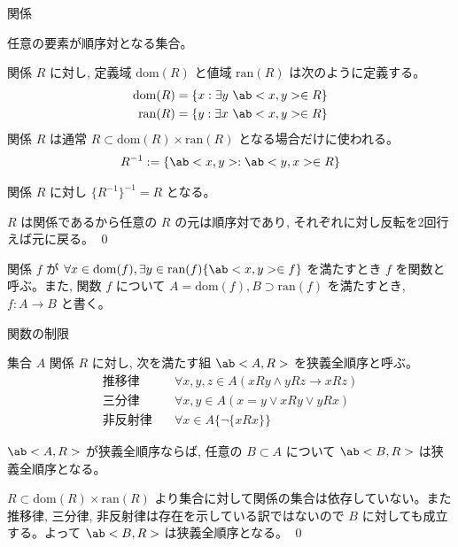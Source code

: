 \documentclass[uplatex,dvipdfmx,a4paper,11pt]{jlreq}
\makeatletter
\theoremstyle{definition}
\renewenvironment{proof}[1][\proofname]{\par
  \normalfont
  \topsep6\p@\@plus6\p@ \trivlist
  \item[\hskip\labelsep{\bfseries #1}\@addpunct{\bfseries}]\ignorespaces\quad\par
}{%
  \qed\endtrivlist\@endpefalse
}
\renewcommand\proofname{証明}
\makeatother
\begin{document}
\begin{definition}
  関係

  任意の要素が順序対となる集合。

  関係 $R$ に対し, 定義域 $\mathrm{dom}(R)$ と値域 $\mathrm{ran}(R)$ は次のように定義する。
  \begin{align}
    \mathrm{dom}(R) & = \{x:\exists y\ \ab<x,y>\in R\} \\
    \mathrm{ran}(R) & = \{y:\exists x\ \ab<x,y>\in R\}
  \end{align}
  関係 $R$ は通常 $R\subset \mathrm{dom}(R)\times\mathrm{ran}(R)$ となる場合だけに使われる。
  \begin{align}
    R^{-1} := \{\ab<x, y>:\ab<y, x>\in R\}
  \end{align}
\end{definition}

\begin{theorem}
  関係 $R$ に対し $\{R^{-1}\}^{-1} = R$ となる。
\end{theorem}
\begin{proof}
  $R$ は関係であるから任意の $R$ の元は順序対であり, それぞれに対し反転を2回行えば元に戻る。
\end{proof}


\begin{definition}[関数]
  関係 $f$ が $\forall x\in\mathrm{dom}(f),\exists y\in\mathrm{ran}(f)\{\ab<x,y>\in f\}$ を満たすとき $f$ を関数と呼ぶ。また, 関数 $f$ について $A=\mathrm{dom}(f), B\supset\mathrm{ran}(f)$ を満たすとき, $f:A\to B$ と書く。

  関数の制限
\end{definition}
\begin{definition}[狭義全順序]
  集合 $A$ 関係 $R$ に対し, 次を満たす組 $\ab<A, R>$ を狭義全順序と呼ぶ。
  \begin{align}
    \text{推移律}\quad  & \forall x,y,z\in A(xRy\land yRz\to xRz) \\
    \text{三分律}\quad  & \forall x, y\in A(x=y\lor xRy\lor yRx)  \\
    \text{非反射律}\quad & \forall x\in A\{\lnot\{xRx\}\}
  \end{align}
\end{definition}

\begin{theorem}
  $\ab<A, R>$ が狭義全順序ならば, 任意の $B\subset A$ について $\ab<B, R>$ は狭義全順序となる。
\end{theorem}
\begin{proof}
  $R\subset \mathrm{dom}(R)\times\mathrm{ran}(R)$ より集合に対して関係の集合は依存していない。また推移律, 三分律, 非反射律は存在を示している訳ではないので $B$ に対しても成立する。よって $\ab<B, R>$ は狭義全順序となる。
\end{proof}
\end{document}
